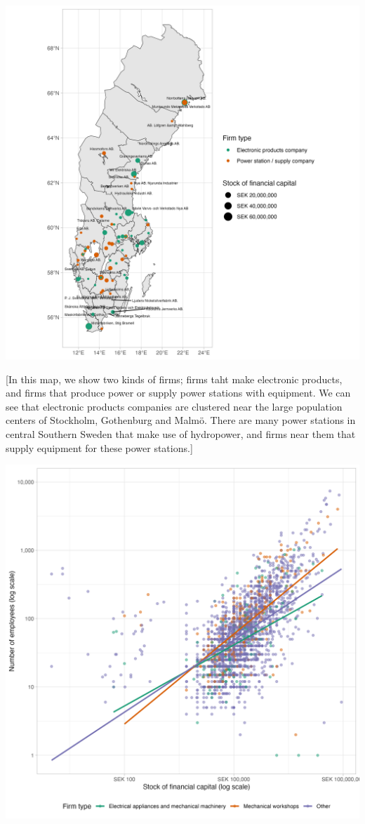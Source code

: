 \documentclass[
]{article}
\begin{document}
\includegraphics{assets/map_of_electricity_related_businesses.png}

{[}In this map, we show two kinds of firms; firms taht make electronic
products, and firms that produce power or supply power stations with
equipment. We can see that electronic products companies are clustered
near the large population centers of Stockholm, Gothenburg and Malmö.
There are many power stations in central Southern Sweden that make use
of hydropower, and firms near them that supply equipment for these power
stations.{]}

\includegraphics{assets/capital_vs_employees.png}
\end{document}
